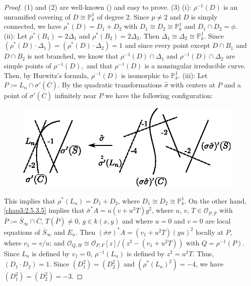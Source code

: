 \begin{proof}
(1) and (2) are well-known (\cf \cite{4}) and easy to prove. (3) (i):
  $\rho^{-1}(D)$ is an unramified covering of $D\cong
  \mathbb{P}^{1}_{k}$ of degree $2$. Since $p\neq 2$ and $D$ is simply
  connected, we have $\rho^{\ast}(D)=D_{1}+D_{2}$ with $D_{1}\cong
  D_{2}\cong \mathbb{P}^{1}_{k}$ and $D_{1}\cap D_{2}=\phi$. (ii): Let
  $\rho^{\ast}(B_{1})=2\Delta_{1}$ and
  $\rho^{\ast}(B_{2})=2\Delta_{2}$. Then $\Delta_{1}\cong
  \Delta_{2}\cong \mathbb{P}^{1}_{k}$. Since $(\rho^{\ast}(D)\cdot
  \Delta_{1})=(\rho^{\ast}(D)\cdot \Delta_{2})=1$ and since every
  point except $D\cap B_{1}$ and $D\cap B_{2}$ is not branched, we
  know that $\rho^{-1}(D)\cap \Delta_{1}$ and $\rho^{-1}(D)\cap
  \Delta_{2}$ are simple points of $\rho^{-1}(D)$,\pageoriginale\ and that
  $\rho^{-1}(D)$ is a nonsingular irreducible curve. Then, by
  Hurwitz's formula, $\rho^{-1}(D)$ is isomorphic to
  $\mathbb{P}^{1}_{k}$. (iii): Let $P:=L_{n}\cap
  \sigma'(\overline{C})$. By the quadratic transformations
  $\widehat{\sigma}$ with centers at $P$ and a point of
  $\sigma'(\overline{C})$ infinitely near $P$ we have the following
  configuration: 
\begin{figure}[H]
\centering
\includegraphics[scale=1.2]{figures/miyansi_fig9.eps}
\end{figure}
\noindent
This implies that $\rho^{\ast}(L_{n})=D_{1}+D_{2}$, where $D_{1}\cong
D_{2}\cong \mathbb{P}^{1}_{k}$. On the other hand, \ref{chap3:2.5.3.5}
implies that $\overline{\sigma}^{\ast}A=u(v+u^{3}T)g^{2}$, where $u$,
$v$, $T\in\mathscr{O}_{\overline{P},\overline{F}}$ with
$\overline{P}:=\overline{S}_{\infty}\cap \overline{C}$,
$T(\overline{P})\neq 0$, $g\in k(x,y)$ and where $u=0$ and $v=0$ are
local equations of $\overline{S}_{\infty}$ and $E_{n}$. Then
$(\overline{\sigma}\sigma)^{\ast}A=(v_{1}+u^{2}T)(gu)^{2}$ locally at
$P$, where $v_{1}=v/u$; and $\mathscr{O}_{Q,H}\cong
\mathscr{O}_{P,F}[z]/(z^{2}-(v_{1}+u^{2}T))$ with
$Q=\rho^{-1}(P)$. Since $L_{n}$ is defined by $v_{1}=0$,
$\rho^{-1}(L_{n})$ is defined by $z^{2}=u^{2}T$. Thus, $(D_{1}\cdot
D_{2})=1$. Since $(D^{2}_{1})=(D^{2}_{2})$ and
$(\rho^{\ast}(L_{n})^{2})=-4$, we have
$(D^{2}_{1})=(D^{2}_{2})=-3$.
\end{proof}


